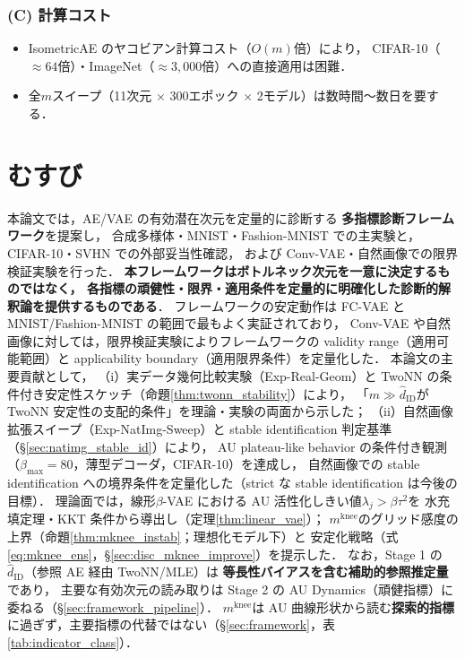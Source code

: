 \documentclass[11pt,a4paper]{jsarticle}
\newcommand{\mknee}{m^{\mathrm{knee}}}
\begin{document}
\subsubsection*{(C) 計算コスト}

\begin{itemize}
  \item IsometricAE のヤコビアン計算コスト（$O(m)$倍）により，
        CIFAR-10（$\approx 64$倍）・ImageNet（$\approx 3{,}000$倍）への直接適用は困難．
  \item 全$m$スイープ（11次元 $\times$ 300エポック $\times$ 2モデル）は数時間〜数日を要する．
\end{itemize}

\section{むすび}\label{sec:conclusion}

本論文では，AE/VAE の有効潜在次元を定量的に診断する
\textbf{多指標診断フレームワーク}を提案し，
合成多様体・MNIST・Fashion-MNIST での主実験と，CIFAR-10・SVHN での外部妥当性確認，
および Conv-VAE・自然画像での限界検証実験を行った．
\textbf{本フレームワークはボトルネック次元を一意に決定するものではなく，
各指標の頑健性・限界・適用条件を定量的に明確化した診断的解釈論を提供するものである}．
フレームワークの安定動作は FC-VAE と MNIST/Fashion-MNIST の範囲で最もよく実証されており，
Conv-VAE や自然画像に対しては，限界検証実験によりフレームワークの
validity range（適用可能範囲）と applicability boundary（適用限界条件）を定量化した．
本論文の主要貢献として，
（i）実データ幾何比較実験（Exp-Real-Geom）と TwoNN の条件付き安定性スケッチ（命題\ref{thm:twonn_stability}）により，
「$m \gg \hat{d}_\mathrm{ID}$が TwoNN 安定性の支配的条件」を理論・実験の両面から示した；
（ii）自然画像拡張スイープ（Exp-NatImg-Sweep）と stable identification 判定基準（§\ref{sec:natimg_stable_id}）により，
AU plateau-like behavior の条件付き観測（$\beta_{\max}=80$，薄型デコーダ，CIFAR-10）を達成し，
自然画像での stable identification への境界条件を定量化した（strict な stable identification は今後の目標）．
理論面では，線形$\beta$-VAE における AU 活性化しきい値$\lambda_j > \beta\tau^2$を
水充填定理・KKT 条件から導出し（定理\ref{thm:linear_vae}）；
$\mknee$のグリッド感度の上界（命題\ref{thm:mknee_instab}；理想化モデル下）と
安定化戦略（式\eqref{eq:mknee_ens}，§\ref{sec:disc_mknee_improve}）を提示した．
なお，Stage 1 の$\hat{d}_\mathrm{ID}$（参照 AE 経由 TwoNN/MLE）は
\textbf{等長性バイアスを含む補助的参照推定量}であり，
主要な有効次元の読み取りは Stage 2 の AU Dynamics（頑健指標）に委ねる（§\ref{sec:framework_pipeline}）．
$\mknee$は AU 曲線形状から読む\textbf{探索的指標}に過ぎず，主要指標の代替ではない（§\ref{sec:framework}，表\ref{tab:indicator_class}）．
\end{document}
